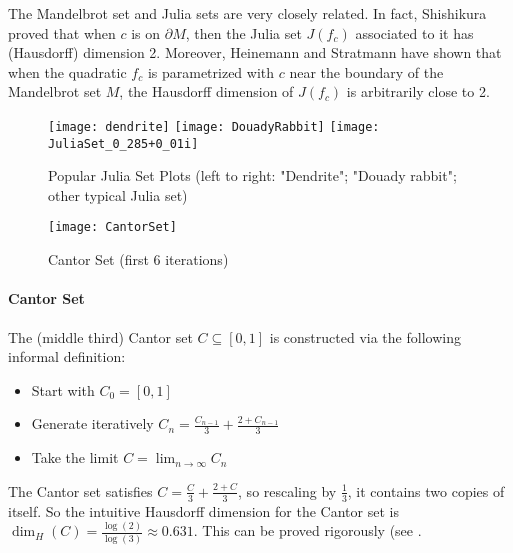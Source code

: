 The Mandelbrot set and Julia sets are very closely related.
In fact, Shishikura proved \cite{Shishikura_1992} that when $c$ is on $\partial M$, then the Julia set $J(f_c)$ associated to it has (Hausdorff) dimension 2.
Moreover, Heinemann and Stratmann have shown \cite{Heinemann_Stratmann_1998} that when the quadratic $f_c$ is parametrized with $c$ near the boundary of the Mandelbrot set $M$, the Hausdorff dimension of $J(f_c)$ is arbitrarily close to 2.

\begin{figure}[h]
	\texttt{[image: dendrite]}
	\hspace{0.15cm}
	\texttt{[image: DouadyRabbit]}
	\hspace{0.15cm}
	\texttt{[image: JuliaSet\_0\_285+0\_01i]}
	\centering
	\captionsetup{justification=centering}
	\caption[Julia sets examples]{Popular Julia Set Plots \newline (left to right: "Dendrite"\footnotemark; "Douady rabbit"\footnotemark; other typical Julia set\footnotemark)}
	\label{fig:JuliaSets}
\end{figure}
\addtocounter{footnote}{-3}



\vspace{-0.5cm}
\begin{wrapfigure}{r}{5cm}
	\texttt{[image: CantorSet]}
	\centering
	\captionsetup{justification=centering}
	\caption{Cantor Set (first 6 iterations)}
	\label{fig:CantorSet}
	\vspace{-1.5cm}
\end{wrapfigure}
\paragraph{Cantor Set}
The (middle third) Cantor set $C \subseteq \left[ 0,1 \right] $ is constructed via the following informal definition:
\begin{itemize}
	\item Start with $C_0 = \left[ 0,1 \right]$
	\item Generate iteratively $C_n = \frac{C_{n-1}}{3} + \frac{2 + C_{n-1}}{3}$
	\item Take the limit $C = \lim_{n \to \infty} C_n$
\end{itemize}

The Cantor set satisfies $C = \frac{C}{3} + \frac{2 + C}{3}$, so rescaling by $\frac{1}{3}$, it contains two copies of itself.
So the intuitive Hausdorff dimension for the Cantor set is $\dim_H(C) = \frac{\log(2)}{\log(3)} \approx 0.631$.
This can be proved rigorously (see \cite[p. 34-35, ex. 2.7]{Falconer_1990}.

